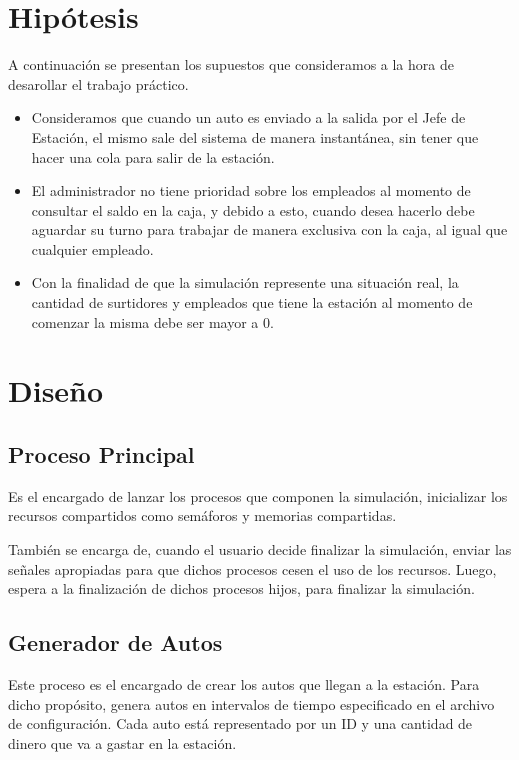 \documentclass[12pt,a4paper,spanish]{article}
\begin{document}

\newpage
\tableofcontents
\newpage
\section{Hipótesis}

A continuación se presentan los supuestos que consideramos a la hora de desarollar el 
trabajo práctico.


\begin{itemize}
	\item Consideramos que cuando un auto es enviado a la salida por el Jefe de Estación,
	el mismo sale del sistema de manera instantánea, sin tener que hacer una cola
	para salir de la estación.

	\item El administrador no tiene prioridad sobre los empleados al momento de consultar
	el saldo en la caja, y debido a esto, cuando desea hacerlo debe aguardar su turno para
	trabajar de manera exclusiva con la caja, al igual que cualquier empleado.

	 \item Con la finalidad de que la simulación represente una situación real, la cantidad
	 de surtidores y empleados que tiene la estación al momento de comenzar la misma debe ser 
	 mayor a 0.
\end{itemize}

\newpage

\section{Diseño}
	\subsection{Proceso Principal}

		Es el encargado de lanzar los procesos que componen la simulación, inicializar los recursos
		compartidos como semáforos y memorias compartidas.

		También se encarga de, cuando el usuario decide finalizar la simulación, enviar las señales
		apropiadas para que dichos procesos cesen el uso de los recursos. Luego, espera a la finalización
		de dichos procesos hijos, para finalizar la simulación.

	\subsection{Generador de Autos}
		
		Este proceso es el encargado de crear los autos que llegan a la estación. Para
		dicho propósito, genera autos en intervalos de tiempo especificado en el archivo de configuración. 
		Cada auto está representado por un ID y una cantidad de dinero que va a gastar en la estación.
\end{document}
